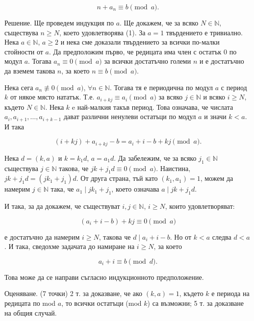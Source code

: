 $$n+a_n\equiv b\pmod a.$$

Решение. Ще проведем индукция по $a$. Ще докажем, че за всяко $N\in\mathbb N$, съществува $n\ge N$, което удовлетворява (1). За $a=1$ твърдението е тривиално. Нека $a\in\mathbb N$, $a\ge2$ и нека сме доказали твърдението за всички по-малки стойности от $a$. Да предположим първо, че редицата има член с остатък 0 по модул $a$. Тогава $a_n\equiv0\pmod a$ за всички достатъчно големи $n$ и е достатъчно да вземем такова $n$, за което $n\equiv b\pmod a$.

Нека сега $a_n\not\equiv0\pmod a$, $\forall n\in\mathbb N$. Тогава тя е периодична по модул $a$ с период $k$ от някое място нататък. Т.е. $a_{i+kj}\equiv a_i\pmod a$ за всяко $j\in\mathbb N$ и всяко $i\ge N$, където $N\in\mathbb N$. Нека $k$ e най-малкия такъв период. Това означава, че числата $a_i,a_{i+1},\ldots,a_{i+k-1}$ дават различни ненулеви остатъци по модул $a$ и значи $k<a$. И така

$$(i+kj)+a_{i+kj}-b=a_i+i-b+kj\pmod a.$$

Нека $d=(k,a)$ и $k=k_1d$, $a=a_1d$. Да забележим, че за всяко $j_1\in\mathbb N$ съществува $j\in\mathbb N$ такова, че $jk+j_1d\equiv0\pmod a$. Наистина, $jk+j_1d=(jk_1+j_1)d$. От друга страна, тъй като $(k_1,a_1)=1$, можем да намерим $j\in\mathbb N$ така, че $a_1\mid jk_1+j_1$, което означава $a\mid jk+j_1d$.

И така, за да докажем, че съществуват $i,j\in\mathbb N$, $i\ge N$, които удовлетворяват:

$$(a_i+i-b)+kj\equiv0\pmod a$$

е достатъчно да намерим $i\ge N$, такова че $d\mid a_i+i-b$. Но от $k<a$ следва $d<a$. И така, сведохме задачата до намиране на $i\ge N$, за което

$$a_i+i\equiv b\pmod d.$$

Това може да се направи съгласно индукционното предположение.

Оценяване. (7 точки) 2 т. за доказване, че ако $(k,a)=1$, където $k$ е периода на редицата по mod $a$, то всички остатъци (mod $k$) са възможни; 5 т. за доказване на общия случай.
